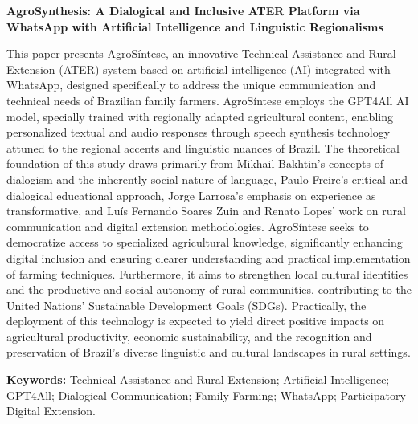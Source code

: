 	\begin{center}
		\textbf{\large AgroSynthesis: A Dialogical and Inclusive ATER Platform via WhatsApp with Artificial Intelligence and Linguistic Regionalisms}
	\end{center}	
	\begin{resumo}[Abstract] %
		This paper presents AgroSíntese, an innovative Technical Assistance and Rural Extension (ATER) system based on artificial intelligence (AI) integrated with WhatsApp, designed specifically to address the unique communication and technical needs of Brazilian family farmers. AgroSíntese employs the GPT4All AI model, specially trained with regionally adapted agricultural content, enabling personalized textual and audio responses through speech synthesis technology attuned to the regional accents and linguistic nuances of Brazil. The theoretical foundation of this study draws primarily from Mikhail Bakhtin's concepts of dialogism and the inherently social nature of language, Paulo Freire's critical and dialogical educational approach, Jorge Larrosa’s emphasis on experience as transformative, and Luís Fernando Soares Zuin and Renato Lopes’ work on rural communication and digital extension methodologies. AgroSíntese seeks to democratize access to specialized agricultural knowledge, significantly enhancing digital inclusion and ensuring clearer understanding and practical implementation of farming techniques. Furthermore, it aims to strengthen local cultural identities and the productive and social autonomy of rural communities, contributing to the United Nations' Sustainable Development Goals (SDGs). Practically, the deployment of this technology is expected to yield direct positive impacts on agricultural productivity, economic sustainability, and the recognition and preservation of Brazil’s diverse linguistic and cultural landscapes in rural settings.
		
		\vspace*{0.5cm}
		
		\noindent\textbf{{Keywords: }} Technical Assistance and Rural Extension; Artificial Intelligence; GPT4All; Dialogical Communication; Family Farming; WhatsApp; Participatory Digital Extension.
		
		
	\end{resumo}
	

	
	

	
